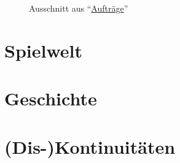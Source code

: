 \documentclass[a5paper,pagesize]{scrbook}
\begin{document}
\vfill
\begin{figure}[p]
   \centering
   \caption{Ausschnitt aus \enquote{\uline{Aufträge}}}
   \label{fig:orpheus_auftraege}
\end{figure}


\clearpage
\section{Spielwelt}\label{sec:orpheus_welt}


\clearpage
\section{Geschichte}\label{sec:orpheus_geschichte}


\clearpage
\section{(Dis-)Kontinuitäten}\label{sec:orpheus_diskontinuitaeten}


\clearpage
\appendix


\clearpage
\printbibliography
\end{document}
